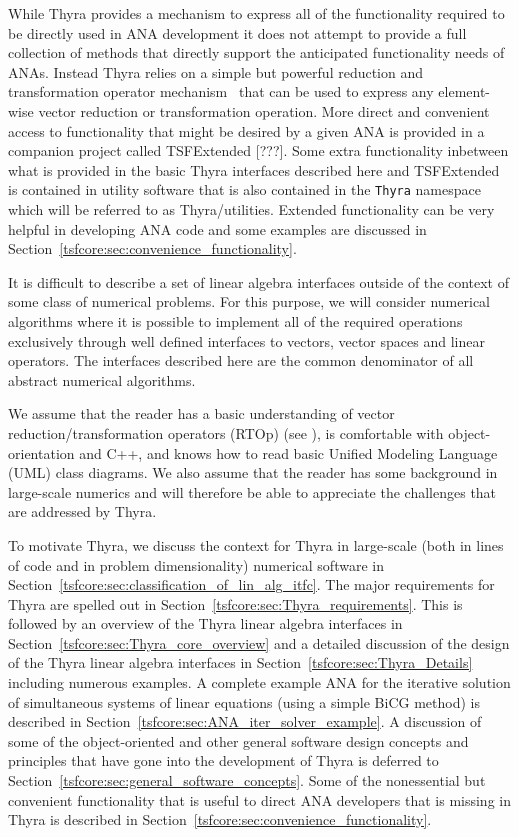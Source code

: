 \documentclass[pdf,ps2pdf,11pt]{SANDreport}
\begin{document}
While Thyra provides a mechanism to express all of the functionality required
to be directly used in ANA development it does not attempt to provide a full
collection of methods that directly support the anticipated functionality
needs of ANAs.  Instead Thyra relies on a simple but powerful reduction and
transformation operator mechanism~\cite{ref:rtop_toms} that can be used to
express any element-wise vector reduction or transformation operation.  More
direct and convenient access to functionality that might be desired by a given
ANA is provided in a companion project called TSFExtended [???].  Some extra
functionality inbetween what is provided in the basic Thyra interfaces
described here and TSFExtended is contained in utility software that is also
contained in the {}\texttt{Thyra} namespace which will be referred to as
Thyra/utilities.  Extended functionality can be very helpful in developing ANA
code and some examples are discussed in
Section~\ref{tsfcore:sec:convenience_functionality}.

It is difficult to describe a set of linear algebra interfaces outside
of the context of some class of numerical problems.  For this purpose,
we will consider numerical algorithms where it is possible to
implement all of the required operations exclusively through well
defined interfaces to vectors, vector spaces and linear operators.
The interfaces described here are the common denominator of all
abstract numerical algorithms.

We assume that the reader has a basic understanding of vector
reduction/transformation operators (RTOp) (see
{}\cite{ref:rtop_toms}), is comfortable with object-orientation
{}\cite{ref:gama_et_al_1995} and C++, and knows how to read basic
Unified Modeling Language (UML) {}\cite{ref:uml_distilled_2nd_ed}
class diagrams.  We also assume that the reader has some background in
large-scale numerics and will therefore be able to appreciate the
challenges that are addressed by Thyra.

To motivate Thyra, we discuss the context for Thyra in large-scale (both in
lines of code and in problem dimensionality) numerical software in
Section~\ref{tsfcore:sec:classification_of_lin_alg_itfc}.  The major
requirements for Thyra are spelled out in
Section~\ref{tsfcore:sec:Thyra_requirements}.  This is followed by an overview
of the Thyra linear algebra interfaces in
Section~\ref{tsfcore:sec:Thyra_core_overview} and a detailed discussion of the
design of the Thyra linear algebra interfaces in
Section~\ref{tsfcore:sec:Thyra_Details} including numerous examples.  A
complete example ANA for the iterative solution of simultaneous systems of
linear equations (using a simple BiCG method) is described in
Section~\ref{tsfcore:sec:ANA_iter_solver_example}.  A discussion of some of
the object-oriented and other general software design concepts and principles
that have gone into the development of Thyra is deferred to
Section~\ref{tsfcore:sec:general_software_concepts}.  Some of the nonessential
but convenient functionality that is useful to direct ANA developers that is
missing in Thyra is described in
Section~\ref{tsfcore:sec:convenience_functionality}.
\end{document}
